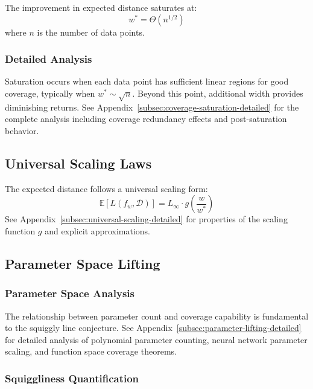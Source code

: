 \begin{theorem}
The improvement in expected distance saturates at:
$$w^* = \Theta(n^{1/2})$$
where $n$ is the number of data points.
\end{theorem}

\subsubsection{Detailed Analysis}

Saturation occurs when each data point has sufficient linear regions for good coverage, typically when $w^* \sim \sqrt{n}$. Beyond this point, additional width provides diminishing returns. See Appendix~\ref{subsec:coverage-saturation-detailed} for the complete analysis including coverage redundancy effects and post-saturation behavior.

\subsection{Universal Scaling Laws}

\begin{theorem}
The expected distance follows a universal scaling form:
$$\mathbb{E}[L(f_w, \mathcal{D})] = L_\infty \cdot g\left(\frac{w}{w^*}\right)$$
See Appendix~\ref{subsec:universal-scaling-detailed} for properties of the scaling function $g$ and explicit approximations.
\end{theorem}

\subsection{Parameter Space Lifting}

\subsubsection{Parameter Space Analysis}

The relationship between parameter count and coverage capability is fundamental to the squiggly line conjecture. See Appendix~\ref{subsec:parameter-lifting-detailed} for detailed analysis of polynomial parameter counting, neural network parameter scaling, and function space coverage theorems.

\subsubsection{Squiggliness Quantification}

